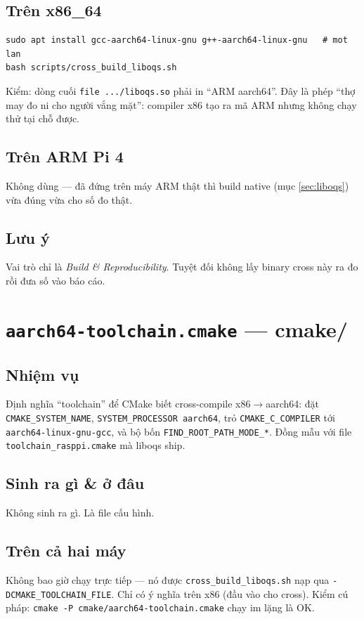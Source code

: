 \documentclass[11pt,a4paper]{article}
\begin{document}
\subsection*{Trên x86\_64}
\begin{lstlisting}
sudo apt install gcc-aarch64-linux-gnu g++-aarch64-linux-gnu   # mot lan
bash scripts/cross_build_liboqs.sh
\end{lstlisting}
Kiểm: dòng cuối \verb|file .../liboqs.so| phải in ``ARM aarch64''. Đây là phép ``thợ may đo ni cho người vắng mặt'': compiler x86 tạo ra mã ARM nhưng không chạy thử tại chỗ được.

\subsection*{Trên ARM Pi 4}
Không dùng — đã đứng trên máy ARM thật thì build native (mục \ref{sec:liboqs}) vừa đúng vừa cho số đo thật.

\subsection*{Lưu ý}
Vai trò chỉ là \emph{Build \& Reproducibility}. Tuyệt đối không lấy binary cross này ra đo rồi đưa số vào báo cáo.

\section{\texttt{aarch64-toolchain.cmake} — \textmd{\normalsize cmake/}}

\subsection*{Nhiệm vụ}
Định nghĩa ``toolchain'' để CMake biết cross-compile x86$\to$aarch64: đặt \verb|CMAKE_SYSTEM_NAME|, \verb|SYSTEM_PROCESSOR aarch64|, trỏ \verb|CMAKE_C_COMPILER| tới \verb|aarch64-linux-gnu-gcc|, và bộ bốn \verb|FIND_ROOT_PATH_MODE_*|. Đồng mẫu với file \verb|toolchain_rasppi.cmake| mà liboqs ship.

\subsection*{Sinh ra gì \& ở đâu}
Không sinh ra gì. Là file cấu hình.

\subsection*{Trên cả hai máy}
Không bao giờ chạy trực tiếp — nó được \verb|cross_build_liboqs.sh| nạp qua \verb|-DCMAKE_TOOLCHAIN_FILE|. Chỉ có ý nghĩa trên x86 (đầu vào cho cross). Kiểm cú pháp: \verb|cmake -P cmake/aarch64-toolchain.cmake| chạy im lặng là OK.
\end{document}

